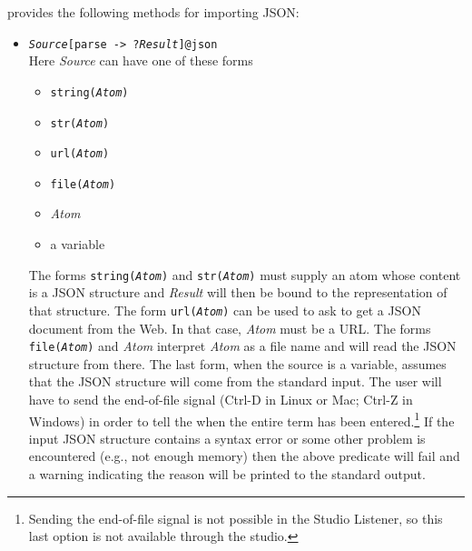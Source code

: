 \ERGO provides the following methods for importing JSON:
\begin{itemize}
\item
  \texttt{\emph{Source}[parse -> ?\emph{Result}]@\bs{}json}\\
  Here \emph{Source} can have one of these forms
  \begin{itemize}
  \item   \texttt{string(\emph{Atom})}  
  \item   \texttt{str(\emph{Atom})}
  \item   \texttt{url(\emph{Atom})}
  \item   \texttt{file(\emph{Atom})}
  \item   \emph{Atom}
  \item   a variable
  \end{itemize}
  The forms \texttt{string(\emph{Atom})} and \texttt{str(\emph{Atom})}
  must supply an atom whose content is a JSON structure and
  \emph{Result} will then be bound to the \ERGO representation of that
  structure.
  The form \texttt{url(\emph{Atom})} can be used to ask \ERGO to get a JSON
  document from the Web. In that case, \emph{Atom} must be a URL. 
  The forms \texttt{file(\emph{Atom})} and \emph{Atom}
  interpret \emph{Atom} as a file name and will read the JSON structure
  from there. The last form, when the source is a variable, assumes
  that the JSON structure will come from the standard input. The user will
  have to send the end-of-file signal (Ctrl-D in Linux or Mac; Ctrl-Z in
  Windows) in order to tell the when the entire term has been entered.\footnote{
    Sending the end-of-file signal is not possible in the \ERGOAI Studio Listener,
    so this last option is not available through the studio.
  }
  If the input JSON structure contains a syntax error or some other problem
  is encountered (e.g., not enough memory) then the above predicate will
  fail and a warning indicating the reason will be printed to the standard
  output.


\end{itemize}
